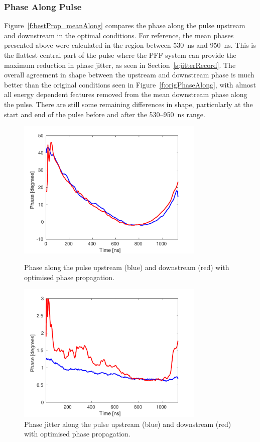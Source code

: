 \subsubsection{Phase Along Pulse}

Figure~\ref{f:bestProp_meanAlong} compares the phase along the pulse upstream and downstream in the optimal conditions. For reference, the mean phases presented above were calculated in the region between 530~ns and 950~ns. This is the flattest central part of the pulse where the PFF system can provide the maximum reduction in phase jitter, as seen in Section~\ref{s:jitterRecord}. The overall agreement in shape between the upstream and downstream phase is much better than the original conditions seen in Figure~\ref{f:origPhaseAlong}, with almost all energy dependent features removed from the mean downstream phase along the pulse. There are still some remaining differences in shape, particularly at the start and end of the pulse before and after the 530--950~ns range.

\begin{figure}
  \centering
  \includegraphics[width=0.8\textwidth]{Figures/propagation/bestProp_meanAlong}
  \caption{Phase along the pulse upstream (blue) and downstream (red) with optimised phase propagation.}
  \label{f:bestProp_meanAlong}
  \includegraphics[width=0.8\textwidth]{Figures/propagation/bestProp_jitAlong}
  \caption{Phase jitter along the pulse upstream (blue) and downstream (red) with optimised phase propagation.}
  \label{f:bestProp_jitAlong}
\end{figure}

